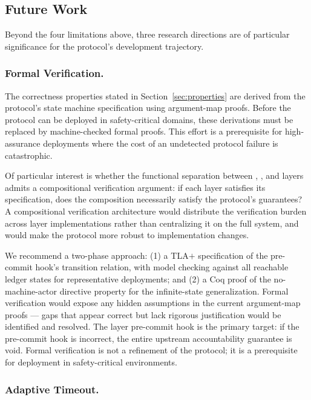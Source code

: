 \subsection{Future Work}

Beyond the four limitations above, three research directions are of particular significance for the protocol's development trajectory.

\subsubsection{Formal Verification.}

The correctness properties stated in Section~\ref{sec:properties} are derived from the protocol's state machine specification using argument-map proofs. Before the protocol can be deployed in safety-critical domains, these derivations must be replaced by machine-checked formal proofs. This effort is a prerequisite for high-assurance deployments where the cost of an undetected protocol failure is catastrophic.

Of particular interest is whether the functional separation between \purpose{}, \bounds{}, and \fact{} layers admits a compositional verification argument: if each layer satisfies its specification, does the composition necessarily satisfy the protocol's guarantees? A compositional verification architecture would distribute the verification burden across layer implementations rather than centralizing it on the full system, and would make the protocol more robust to implementation changes.

We recommend a two-phase approach: (1) a TLA$+$ specification of the pre-commit hook's transition relation, with model checking against all reachable ledger states for representative deployments; and (2) a Coq proof of the no-machine-actor directive property for the infinite-state generalization. Formal verification would expose any hidden assumptions in the current argument-map proofs --- gaps that appear correct but lack rigorous justification would be identified and resolved. The \fact{} layer pre-commit hook is the primary target: if the pre-commit hook is incorrect, the entire upstream accountability guarantee is void. Formal verification is not a refinement of the protocol; it is a prerequisite for deployment in safety-critical environments.

\subsubsection{Adaptive Timeout.}

